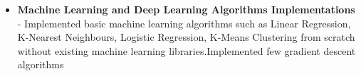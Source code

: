 \documentclass{article}
\begin{document}
\begin{itemize}
    \item{\textbf{\large{Machine Learning and Deep Learning Algorithms Implementations}}}
          \newline
          \textmd{- Implemented basic machine learning algorithms such as Linear Regression, K-Nearest Neighbours, Logistic Regression, K-Means Clustering from scratch without existing machine learning libraries.Implemented few gradient descent algorithms
          }
          \newline




\end{itemize}




\end{document}
